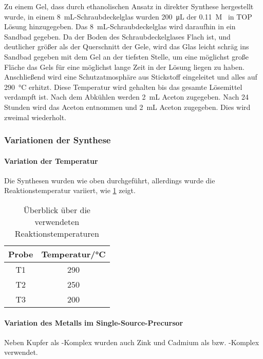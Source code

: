 			Zu einem Gel, dass durch ethanolischen Ansatz in direkter Synthese hergestellt wurde, in einem \SI{8}{\milli\liter}-Schraubdeckelglas wurden \SI{200}{\micro\liter} der 0.11~M~ in TOP Lösung hinzugegeben.
			Das \SI{8}{\milli\liter}-Schraubdeckelglas wird daraufhin in ein Sandbad gegeben.
			Da der Boden des Schraubdeckelglases Flach ist, und deutlicher größer als der Querschnitt der Gele, wird das Glas leicht schräg ins Sandbad gegeben mit dem Gel an der tiefsten Stelle, um eine möglichst große Fläche das Gels für eine möglichst lange Zeit in der Lösung liegen zu haben.
			Anschließend wird eine Schutzatmosphäre aus Stickstoff eingeleitet und alles auf \SI{290}{\degreeCelsius} erhitzt.
			Diese Temperatur wird gehalten bis das gesamte Lösemittel verdampft ist.
			Nach dem Abkühlen werden \SI{2}{\milli\liter} Aceton zugegeben. 
			Nach 24 Stunden wird das Aceton entnommen und \SI{2}{\milli\liter} Aceton zugegeben.
			Dies wird zweimal wiederholt. 
			
			\subsubsection{Variationen der Synthese}
				
				\paragraph{Variation der Temperatur}
				\qquad\newline
					Die Synthesen wurden wie oben durchgeführt, allerdings wurde die Reaktionstemperatur variiert, wie \cref{tab:Temperatur} zeigt.
					
					\begin{table}[htbp]
						\centering
						\caption{Überblick über die verwendeten Reaktionstemperaturen}
						\label{tab:Temperatur}
						\begin{tabular}{cc}
							\toprule
							Probe & Temperatur/\si{\degreeCelsius}\\
							\midrule
							T1 & 290\\
							T2 & 250\\
							T3 & 200\\
							\bottomrule
						\end{tabular}
					\end{table}
				
				\paragraph{Variation des Metalls im Single-Source-Precursor}
				\qquad\newline
					Neben Kupfer als -Komplex wurden auch Zink und Cadmium als  bzw. -Komplex verwendet.
					
